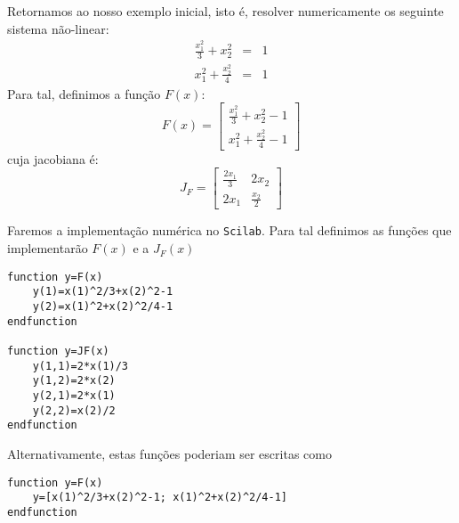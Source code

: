 \begin{ex} Retornamos ao nosso exemplo inicial, isto é, resolver numericamente os seguinte sistema não-linear:
\begin{eqnarray*}
\frac{x_1^2}{3}+x_2^2&=&1\\
x_1^2+\frac{x_2^2}{4}&=&1
\end{eqnarray*}
Para tal, definimos a função $F(x)$:
\begin{equation*}
  F(x)=\left[
\begin{array}{c}
\displaystyle \frac{x_1^2}{3}+x_2^2-1\\
\displaystyle x_1^2+\frac{x_2^2}{4}-1
\end{array}
\right]
\end{equation*}
cuja jacobiana é:
\begin{equation*}
  J_F=\left[\begin{array}{cc}
      \displaystyle \frac{2x_1}{3} & 2x_2\\
      \displaystyle 2x_1&\frac{x_2}{2}
    \end{array}\right]
\end{equation*}

\ifisscilab
Faremos a implementação numérica no \verb+Scilab+. Para tal definimos as funções que implementarão $F(x)$ e a $J_F(x)$
\begin{verbatim}
function y=F(x)
    y(1)=x(1)^2/3+x(2)^2-1
    y(2)=x(1)^2+x(2)^2/4-1
endfunction

function y=JF(x)
    y(1,1)=2*x(1)/3
    y(1,2)=2*x(2)
    y(2,1)=2*x(1)
    y(2,2)=x(2)/2
endfunction
\end{verbatim}
Alternativamente, estas funções poderiam ser escritas como
\begin{verbatim}
function y=F(x)
    y=[x(1)^2/3+x(2)^2-1; x(1)^2+x(2)^2/4-1]
endfunction


\end{verbatim}
\end{ex}

